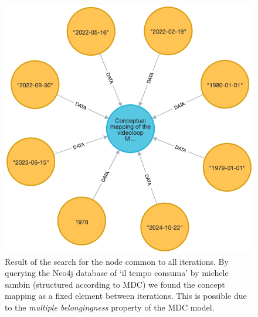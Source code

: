 \begin{figure}[!h]
    \centering
    \includegraphics[width=0.75\linewidth]{chapters/4-MDC_model_application/image/neo4j-multiplebel02.png}
    \caption{Result of the search for the node common to all iterations. By querying the Neo4j database of ‘il tempo consuma’ by michele sambin (structured according to MDC) we found the concept mapping as a fixed element between iterations. This is possible due to the \textit{multiple belongingness} property of the MDC model.}
    \label{fig:c4-neo4j-multiplebel02}
\end{figure}

